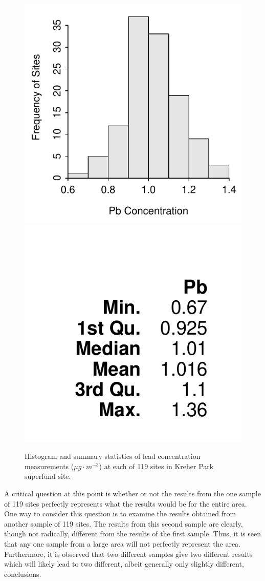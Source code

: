\documentclass[10pt,openany]{book}\usepackage[]{graphicx}\usepackage[]{color}
\newenvironment{knitrout}{}{} %
\begin{document}
\begin{knitrout}
\color{fgcolor}\begin{figure}[hbtp]

{\centering \includegraphics[width=.4\linewidth]{Figs/KreherParkPbhist-1} 
\includegraphics[width=.4\linewidth]{Figs/KreherParkPbhist-2} 

}

\caption[Histogram and summary statistics of lead concentration measurements ($\mu g \cdot m^{-3}$) at each of 119 sites in Kreher Park superfund site]{Histogram and summary statistics of lead concentration measurements ($\mu g \cdot m^{-3}$) at each of 119 sites in Kreher Park superfund site.}\label{fig:KreherParkPbhist}
\end{figure}


\end{knitrout}

A critical question at this point is whether or not the results from the one sample of 119 sites perfectly represents what the results would be for the entire area.  One way to consider this question is to examine the results obtained from another sample of 119 sites.  The results from this second sample  are clearly, though not radically, different from the results of the first sample.  Thus, it is seen that any one sample from a large area will not perfectly represent the area.  Furthermore, it is observed that two different samples give two different results which will likely lead to two different, albeit generally only slightly different, conclusions.
\end{document}
